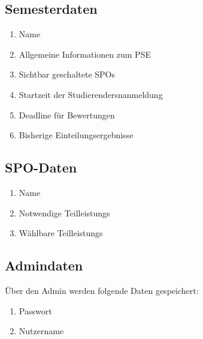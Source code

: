 \documentclass[parskip=full]{scrartcl}
\newcommand{\swtLabel}[1]{\textbf{/#1\arabic*0/}}
\begin{document}
\subsection{Semesterdaten}
\begin{enumerate}[label=\swtLabel{D}, resume]
    \item Name
    \item Allgemeine Informationen zum \gls{PSE}
    \item Sichtbar geschaltete \glspl{SPO}
    \item Startzeit der \glspl{Studierender}nanmeldung
    \item Deadline für \gls{Bewertung}en
    \item Bisherige \gls{Einteilung}sergebnisse
\end{enumerate}

\subsection{SPO-Daten}
\begin{enumerate}[label=\swtLabel{D}, resume]
	\item Name
	\item Notwendige \glspl{Teilleistung}
	\item Wählbare \glspl{Teilleistung}
\end{enumerate}


\subsection{Admindaten}
Über den \gls{Admin} werden folgende Daten gespeichert:
\begin{enumerate}[label=\swtLabel{D}, resume] 
	\item Passwort
	\item Nutzername
\end{enumerate}
\end{document}
